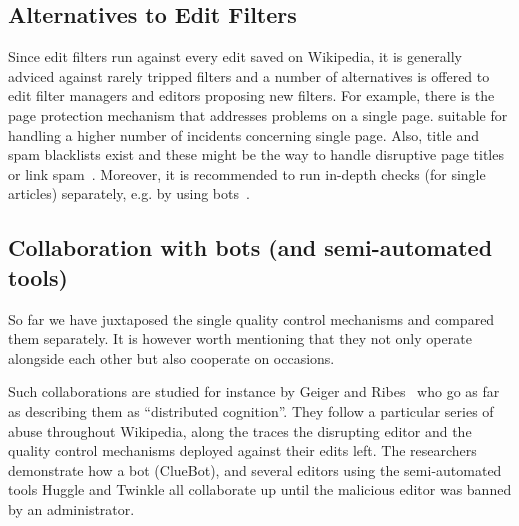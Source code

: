 \subsection{Alternatives to Edit Filters}

Since edit filters run against every edit saved on Wikipedia, it is generally adviced against rarely tripped filters and a number of alternatives is offered to edit filter managers and editors proposing new filters.
For example, there is the page protection mechanism that addresses problems on a single page.
suitable for handling a higher number of incidents concerning single page.
Also, title and spam blacklists exist and these might be the way to handle disruptive page titles or link spam~\cite{Wikipedia:EditFilter}.
Moreover, it is recommended to run in-depth checks (for single articles) separately, e.g. by using bots~\cite{Wikipedia:EditFilterRequested}.


\subsection{Collaboration with bots (and semi-automated tools)}

So far we have juxtaposed the single quality control mechanisms and compared them separately.
It is however worth mentioning that they not only operate alongside each other but also cooperate on occasions.

Such collaborations are studied for instance by Geiger and Ribes~\cite{GeiRib2010} who go as far as describing them as ``distributed cognition''.
They follow a particular series of abuse throughout Wikipedia, along the traces the disrupting editor and the quality control mechanisms deployed against their edits left.
The researchers demonstrate how a bot (ClueBot), and several editors using the semi-automated tools Huggle and Twinkle all collaborate up until the malicious editor was banned by an administrator.

